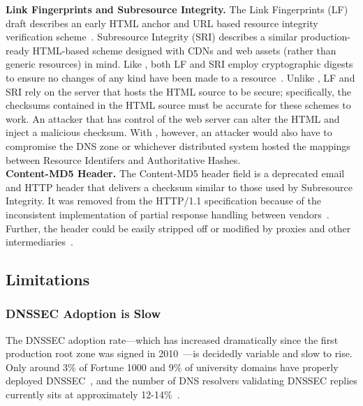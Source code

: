 \noindent\textbf{Link Fingerprints and Subresource Integrity.} The Link
Fingerprints (LF) draft describes an early HTML anchor and URL based resource
integrity verification scheme~\cite{LF}. Subresource Integrity (SRI) describes a
similar production-ready HTML-based scheme designed with CDNs and web assets
(rather than generic resources) in mind. Like \SYSTEM{}, both LF and SRI employ
cryptographic digests to ensure no changes of any kind have been made to a
resource~\cite{SRI}. Unlike \SYSTEM{}, LF and SRI rely on the server that hosts
the HTML source to be secure; specifically, the checksums contained in the HTML
source must be accurate for these schemes to work. An attacker that has control
of the web server can alter the HTML and inject a malicious checksum. With
\SYSTEM{}, however, an attacker would also have to compromise the DNS zone or
whichever distributed system hosted the mappings between Resource Identifers and
Authoritative Hashes. \\

\noindent\textbf{Content-MD5 Header.} The Content-MD5 header field is a
deprecated email and HTTP header that delivers a checksum similar to those used
by Subresource Integrity. It was removed from the HTTP/1.1 specification because
of the inconsistent implementation of partial response handling between
vendors~\cite{HTTP1.1}. Further, the header could be easily stripped off or
modified by proxies and other intermediaries~\cite{MD5Header}.

\subsection{Limitations}

\subsubsection{DNSSEC Adoption is Slow}

The DNSSEC adoption rate---which has increased dramatically since the first
production root zone was signed in 2010~\cite{Cloudflare, APNIC}---is decidedly
variable and slow to rise. Only around 3\% of Fortune 1000 and 9\% of university
domains have properly deployed DNSSEC~\cite{NIST-IPv6}, and the number of DNS
resolvers validating DNSSEC replies currently sits at approximately
12-14\%~\cite{APNIC}.

